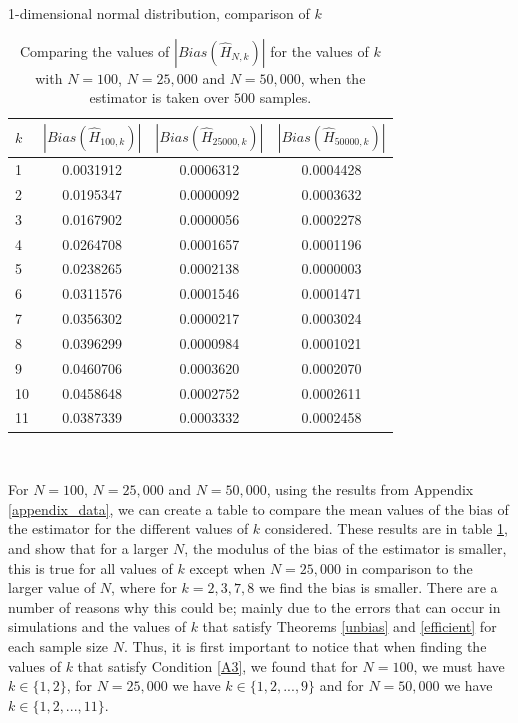 \documentclass[12pt]{report}
\begin{document}
\begin{table}
\caption{1-dimensional normal distribution, comparison of $k$} \label{normal_kcompare_table}
\begin{center}
\begin{tabular}{| l | c c c |} 
\toprule
$k$ &  $|Bias(\hat{H}_{100, k})|$ & $|Bias(\hat{H}_{25000, k})|$  &  $|Bias(\hat{H}_{50000, k})|$ \\
\midrule[1pt]
1     & 0.0031912    & 0.0006312    & 0.0004428   \\
2     & 0.0195347    & 0.0000092    & 0.0003632   \\
3     & 0.0167902    & 0.0000056    & 0.0002278   \\
4     & 0.0264708    & 0.0001657    & 0.0001196   \\
5     & 0.0238265    & 0.0002138    & 0.0000003   \\
6     & 0.0311576    & 0.0001546    & 0.0001471   \\
7     & 0.0356302    & 0.0000217    & 0.0003024   \\
8     & 0.0396299    & 0.0000984    & 0.0001021   \\
9     & 0.0460706    & 0.0003620    & 0.0002070   \\
10    & 0.0458648    & 0.0002752    & 0.0002611   \\
11    & 0.0387339    & 0.0003332    & 0.0002458   \\
\hline
\end{tabular}
\\[10pt]
\caption*{Comparing the values of $|Bias(\hat{H}_{N, k})|$ for the values of $k$ with $N=100$, $N=25,000$ and $N=50,000$, when the estimator is taken over $500$ samples.}
\end{center}
\end{table}

For $N=100$, $N=25,000$ and $N=50,000$, using the results from Appendix \ref{appendix_data}, we can create a table to compare the mean values of the bias of the estimator for the different values of $k$ considered. These results are in table \ref{normal_kcompare_table}, and show that for a larger $N$, the modulus of the bias of the estimator is smaller, this is true for all values of $k$ except when $N=25,000$ in comparison to the larger value of $N$, where for $k=2, 3, 7, 8$ we find the bias is smaller. There are a number of reasons why this could be; mainly due to the errors that can occur in simulations and the values of $k$ that satisfy Theorems \ref{unbias} and \ref{efficient} for each sample size $N$. Thus, it is first important to notice that when finding the values of $k$ that satisfy Condition \ref{A3}, we found that for $N=100$, we must have $k \in \{1, 2\}$, for $N=25,000$ we have $k \in \{1, 2, ..., 9 \}$ and for $N=50,000$ we have $k \in \{1, 2, ..., 11\}$.
\end{document}
